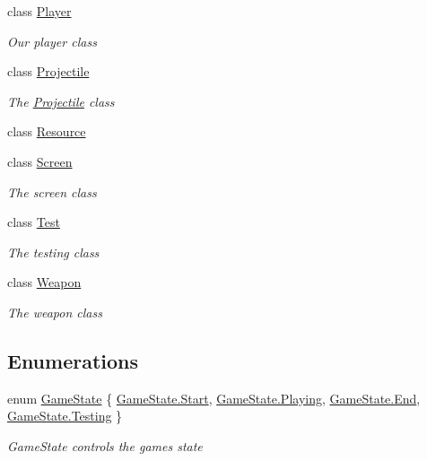 \begin{DoxyCompactItemize}
class \hyperlink{classXaria_1_1Player}{Player}
\begin{DoxyCompactList}\small\item\em Our player class \end{DoxyCompactList}\item 
class \hyperlink{classXaria_1_1Projectile}{Projectile}
\begin{DoxyCompactList}\small\item\em The \hyperlink{classXaria_1_1Projectile}{Projectile} class \end{DoxyCompactList}\item 
class \hyperlink{classXaria_1_1Resource}{Resource}
\item 
class \hyperlink{classXaria_1_1Screen}{Screen}
\begin{DoxyCompactList}\small\item\em The screen class \end{DoxyCompactList}\item 
class \hyperlink{classXaria_1_1Test}{Test}
\begin{DoxyCompactList}\small\item\em The testing class \end{DoxyCompactList}\item 
class \hyperlink{classXaria_1_1Weapon}{Weapon}
\begin{DoxyCompactList}\small\item\em The weapon class \end{DoxyCompactList}\end{DoxyCompactItemize}
\subsection*{Enumerations}
\begin{DoxyCompactItemize}
\item 
enum \hyperlink{namespaceXaria_a2c2420c982c39ab01bdb72f1d7d4aac7}{Game\+State} \{ \hyperlink{namespaceXaria_a2c2420c982c39ab01bdb72f1d7d4aac7aa6122a65eaa676f700ae68d393054a37}{Game\+State.\+Start}, 
\hyperlink{namespaceXaria_a2c2420c982c39ab01bdb72f1d7d4aac7ac9dbb2b7c84159b632d71e512eba8428}{Game\+State.\+Playing}, 
\hyperlink{namespaceXaria_a2c2420c982c39ab01bdb72f1d7d4aac7a87557f11575c0ad78e4e28abedc13b6e}{Game\+State.\+End}, 
\hyperlink{namespaceXaria_a2c2420c982c39ab01bdb72f1d7d4aac7afa6a5a3224d7da66d9e0bdec25f62cf0}{Game\+State.\+Testing}
 \}\begin{DoxyCompactList}\small\item\em Game\+State controls the game\textquotesingle{}s state \end{DoxyCompactList}
\end{DoxyCompactItemize}


